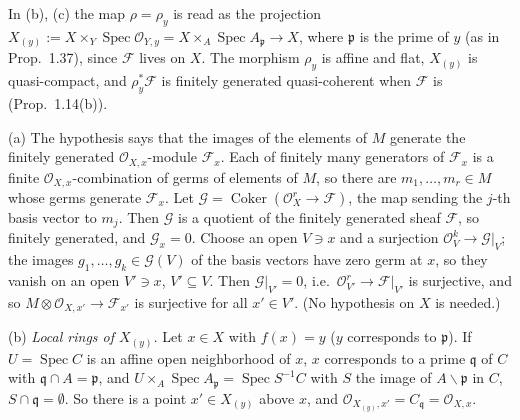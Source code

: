 \documentclass[11pt]{article}
\begin{document}
\pf
In (b), (c) the map $\rho=\rho_y$ is read as the projection $X_{(y)}:=X\times_Y\operatorname{Spec}\mathcal{O}_{Y,y}=X\times_A\operatorname{Spec}A_\mathfrak{p}\to X$, where $\mathfrak{p}$ is the prime of $y$ (as in Prop.~1.37), since $\mathcal{F}$ lives on $X$. The morphism $\rho_y$ is affine and flat, $X_{(y)}$ is quasi-compact, and $\rho_y^*\mathcal{F}$ is finitely generated quasi-coherent when $\mathcal{F}$ is (Prop.~1.14(b)).

(a) The hypothesis says that the images of the elements of $M$ generate the finitely generated $\mathcal{O}_{X,x}$-module $\mathcal{F}_x$. Each of finitely many generators of $\mathcal{F}_x$ is a finite $\mathcal{O}_{X,x}$-combination of germs of elements of $M$, so there are $m_1,\dots,m_r\in M$ whose germs generate $\mathcal{F}_x$. Let $\mathcal{G}=\operatorname{Coker}(\mathcal{O}_X^r\to\mathcal{F})$, the map sending the $j$-th basis vector to $m_j$. Then $\mathcal{G}$ is a quotient of the finitely generated sheaf $\mathcal{F}$, so finitely generated, and $\mathcal{G}_x=0$. Choose an open $V\ni x$ and a surjection $\mathcal{O}_V^k\to\mathcal{G}|_V$; the images $g_1,\dots,g_k\in\mathcal{G}(V)$ of the basis vectors have zero germ at $x$, so they vanish on an open $V'\ni x$, $V'\subseteq V$. Then $\mathcal{G}|_{V'}=0$, i.e.\ $\mathcal{O}_{V'}^r\to\mathcal{F}|_{V'}$ is surjective, and so $M\otimes\mathcal{O}_{X,x'}\to\mathcal{F}_{x'}$ is surjective for all $x'\in V'$. (No hypothesis on $X$ is needed.)

(b) \emph{Local rings of $X_{(y)}$.} Let $x\in X$ with $f(x)=y$ ($y$ corresponds to $\mathfrak{p}$). If $U=\operatorname{Spec}C$ is an affine open neighborhood of $x$, $x$ corresponds to a prime $\mathfrak{q}$ of $C$ with $\mathfrak{q}\cap A=\mathfrak{p}$, and $U\times_A\operatorname{Spec}A_\mathfrak{p}=\operatorname{Spec}S^{-1}C$ with $S$ the image of $A\smallsetminus\mathfrak{p}$ in $C$, $S\cap\mathfrak{q}=\emptyset$. So there is a point $x'\in X_{(y)}$ above $x$, and $\mathcal{O}_{X_{(y)},x'}=C_\mathfrak{q}=\mathcal{O}_{X,x}$.
\end{document}
